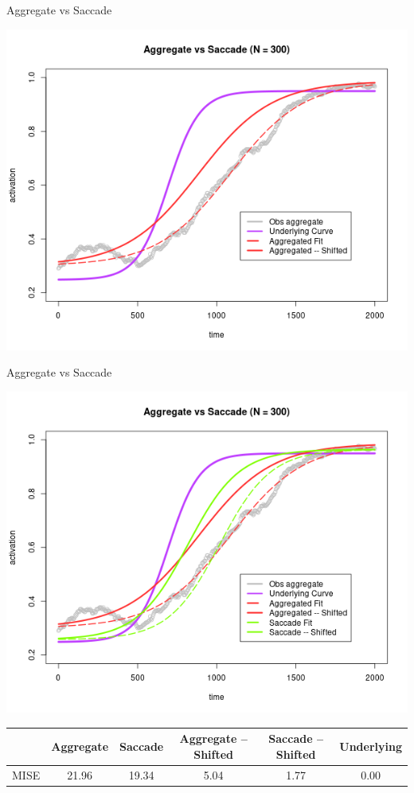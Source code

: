 \documentclass{beamer}
\begin{document}
\begin{frame}{Aggregate vs Saccade}
\begin{center}
\includegraphics[scale=0.45]{img/aggregate_sac_1.png}
\end{center}
\end{frame}

\begin{frame}{Aggregate vs Saccade}
\begin{center}
\includegraphics[scale=0.4]{img/aggregate_sac_2.png}
\end{center}
{\scriptsize
\begin{table}[H]
\captionsetup{font=scriptsize}
\centering
\begin{tabular}{rccccc}
  \hline
 & Aggregate & Saccade  & Aggregate -- Shifted & Saccade -- Shifted & Underlying \\ 
  \hline
MISE & 21.96 & 19.34
& 5.04 & 1.77 & 0.00 \\ 
   \hline
\end{tabular}
\end{table}
}
\end{frame}
\end{document}
